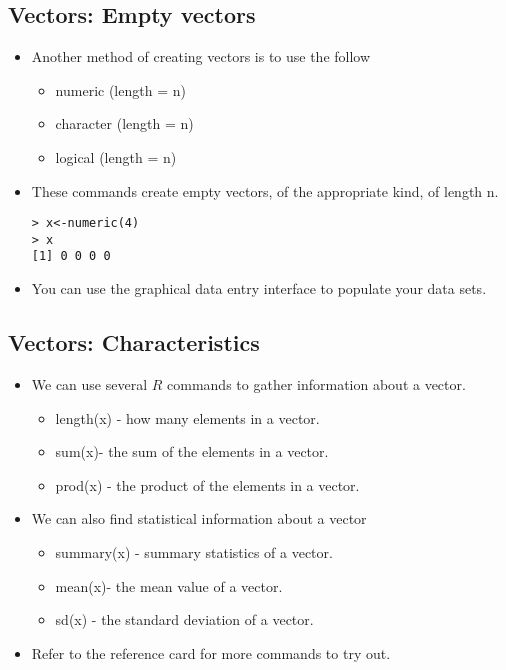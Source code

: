 \subsection{Vectors: Empty vectors}

\begin{itemize}
\item Another method of creating vectors is to use the follow

\begin{itemize}
\item numeric (length = n) \item character (length = n) \item
logical (length = n)\end{itemize}

\item These commands create empty vectors, of the appropriate
kind, of length n.

\begin{verbatim}
> x<-numeric(4)
> x
[1] 0 0 0 0
\end{verbatim}

\item You can use the graphical data entry interface to populate
your data sets.
\end{itemize}


\subsection{Vectors: Characteristics}

\begin{itemize}
\item We can use several $R$ commands to gather information about
a vector.

\begin{itemize}
\item length(x) - how many elements in a vector.  \item sum(x)-
the sum of the elements in a vector. \item prod(x) - the product
of the elements in a vector.
\end{itemize}

\item We can also find statistical information about a vector
\begin{itemize}
\item summary(x) - summary statistics of a vector.  \item mean(x)-
the mean value of a vector. \item sd(x) -  the standard deviation
of a vector.
\end{itemize}

\item Refer to the reference card for more commands to try out.
\end{itemize}

